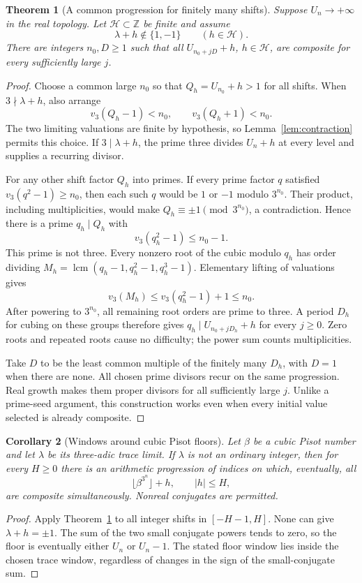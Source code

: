 \documentclass[11pt,a4paper]{article}
\newtheorem{theorem}{Theorem}[section]
\newtheorem{corollary}[theorem]{Corollary}
\theoremstyle{remark}\newtheorem{remark}[theorem]{Remark}
\newcommand{\Z}{\mathbb Z}\newcommand{\Q}{\mathbb Q}
\begin{document}
\begin{theorem}[A common progression for finitely many shifts]
\label{thm:windows}
Suppose $U_n\to+\infty$ in the real topology. Let
$\mathcal H\subset\Z$ be finite and assume
\[
 \lambda+h\notin\{1,-1\}\qquad(h\in\mathcal H).
\]
There are integers $n_0,D\ge1$ such that all
$U_{n_0+jD}+h$, $h\in\mathcal H$, are composite for every
sufficiently large $j$.
\end{theorem}
\begin{proof}
Choose a common large $n_0$ so that $Q_h=U_{n_0}+h>1$ for all
shifts. When $3\nmid\lambda+h$, also arrange
\[
 v_3(Q_h-1)<n_0,\qquad v_3(Q_h+1)<n_0.
\]
The two limiting valuations are finite by hypothesis, so
Lemma~\ref{lem:contraction} permits this choice.
If $3\mid\lambda+h$, the prime three divides $U_n+h$ at every
level and supplies a recurring divisor.

For any other shift factor $Q_h$ into primes. If every prime factor
$q$ satisfied $v_3(q^2-1)\ge n_0$, then each such $q$ would be
$1$ or $-1$ modulo $3^{n_0}$. Their product, including
multiplicities, would make $Q_h\equiv\pm1\pmod{3^{n_0}}$,
a contradiction. Hence there is a prime $q_h\mid Q_h$ with
\[
 v_3(q_h^2-1)\le n_0-1.
\]
This prime is not three. Every nonzero root of the cubic modulo
$q_h$ has order dividing
$M_h=\operatorname{lcm}(q_h-1,q_h^2-1,q_h^3-1)$.
Elementary lifting of valuations gives
\[
 v_3(M_h)\le v_3(q_h^2-1)+1\le n_0.
\]
After powering to $3^{n_0}$, all remaining root orders are prime
to three. A period $D_h$ for cubing on these groups therefore gives
$q_h\mid U_{n_0+jD_h}+h$ for every $j\ge0$. Zero roots and repeated
roots cause no difficulty; the power sum counts multiplicities.

Take $D$ to be the least common multiple of the finitely many
$D_h$, with $D=1$ when there are none. All chosen prime divisors recur on the same progression.
Real growth makes them proper divisors for all sufficiently large
$j$. Unlike a prime-seed argument, this construction works even
when every initial value selected is already composite.
\end{proof}

\begin{corollary}[Windows around cubic Pisot floors]\label{cor:pisotwindows}
Let $\beta$ be a cubic Pisot number and let $\lambda$ be its
three-adic trace limit. If $\lambda$ is not an ordinary integer,
then for every $H\ge0$ there is an arithmetic progression of indices
on which, eventually, all
\[
 \lfloor\beta^{3^n}\rfloor+h,\qquad |h|\le H,
\]
are composite simultaneously. Nonreal conjugates are permitted.
\end{corollary}
\begin{proof}
Apply Theorem~\ref{thm:windows} to all integer shifts in
$[-H-1,H]$. None can give $\lambda+h=\pm1$. The sum of the two
small conjugate powers tends to zero, so the floor is eventually
either $U_n$ or $U_n-1$. The stated floor window lies inside the
chosen trace window, regardless of changes in the sign of the
small-conjugate sum.
\end{proof}
\end{document}
